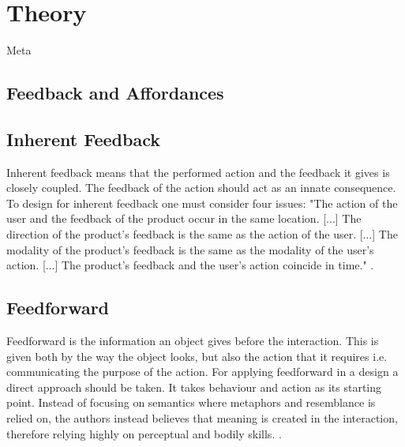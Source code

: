 \chapter{Theory}

Meta

\section{Feedback and Affordances}
\cite{norman} \cite{fullerton}

\section{Inherent Feedback}
Inherent feedback means that the performed action and the feedback it gives is closely coupled. The feedback of the action should act as an innate consequence. To design for inherent feedback one must consider four issues: "The action of the user and the feedback of the product occur in the
same location. [...] The direction of the product's feedback is the same as the action of
the user. [...] The modality of the product's feedback is the same as the modality
of the user's action. [...] The product's feedback and the user's action coincide in time." \cite{howdonald}.

\section{Feedforward}
Feedforward is the information an object gives before the interaction. This is given both by the way the object looks, but also the action that it requires i.e. communicating the purpose of the action. For applying feedforward in a design a direct approach should be taken. It takes behaviour and action as its starting point. Instead of focusing on semantics where metaphors and resemblance is relied on, the authors instead believes that meaning is created in the interaction, therefore relying highly on perceptual and bodily skills. \cite{howdonald}.
